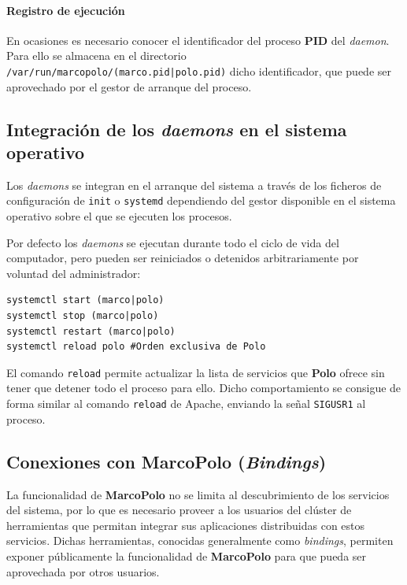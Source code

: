 
\paragraph{Registro de ejecución}

En ocasiones es necesario conocer el identificador del proceso \textbf{PID} del \textit{daemon}. Para ello se almacena en el directorio \texttt{/var/run/marcopolo/(marco.pid|polo.pid)} dicho identificador, que puede ser aprovechado por el gestor de arranque del proceso.

\subsection{Integración de los \textit{daemons} en el sistema operativo}

Los \textit{daemons} se integran en el arranque del sistema a través de los ficheros de configuración de \texttt{init}\citationneeded{} o \texttt{systemd} dependiendo del gestor disponible en el sistema operativo sobre el que se ejecuten los procesos.

Por defecto los \textit{daemons} se ejecutan durante todo el ciclo de vida del computador, pero pueden ser reiniciados o detenidos arbitrariamente por voluntad del administrador:

\begin{lstlisting}
systemctl start (marco|polo)
systemctl stop (marco|polo)
systemctl restart (marco|polo)
systemctl reload polo #Orden exclusiva de Polo
\end{lstlisting}

El comando \texttt{reload} permite actualizar la lista de servicios que \textbf{Polo} ofrece sin tener que detener todo el proceso para ello. Dicho comportamiento se consigue de forma similar al comando \texttt{reload} de Apache, enviando la señal \texttt{SIGUSR1} al proceso. 

\subsection{Conexiones con MarcoPolo (\textit{Bindings})}

La funcionalidad de \textbf{MarcoPolo} no se limita al descubrimiento de los servicios del sistema, por lo que es necesario proveer a los usuarios del clúster de herramientas que permitan integrar sus aplicaciones distribuidas con estos servicios. Dichas herramientas, conocidas generalmente como \textit{bindings}, permiten exponer públicamente la funcionalidad de \textbf{MarcoPolo} para que pueda ser aprovechada por otros usuarios.

